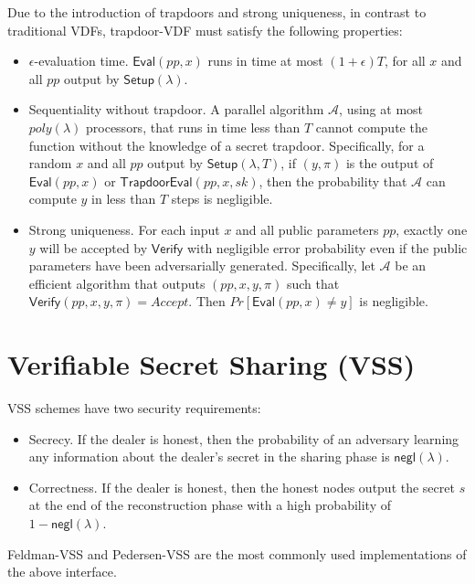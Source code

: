 \documentclass[letterpaper,twocolumn,10pt]{article}
\theoremstyle{definition}
\theoremstyle{remark}
\begin{document}
Due to the introduction of trapdoors and strong uniqueness, in contrast to traditional VDFs, trapdoor-VDF must satisfy the following properties:

\begin{itemize}
    \item $\epsilon$-evaluation time. $\mathsf{Eval}(pp, x)$ runs in time at most $(1 + \epsilon) T$, for all $x$ and all $pp$ output by $\mathsf{Setup}(\lambda)$.
    \item Sequentiality without trapdoor. A parallel algorithm $\mathcal{A}$, using at most $poly(\lambda)$ processors, that runs in time less than $T$ cannot compute the function without the knowledge of a secret trapdoor. Specifically, for a random $x$ and all $pp$ output by $\mathsf{Setup}(\lambda, T)$, if $(y, \pi)$ is the output of $\mathsf{Eval}(pp, x)$ or $\mathsf{TrapdoorEval}(pp,x,sk)$, then the probability that $\mathcal{A}$ can compute $y$ in less than $T$ steps is negligible.
    \item Strong uniqueness. For each input $x$ and all public parameters $pp$, exactly one $y$ will be accepted by $\mathsf{Verify}$ with negligible error probability even if the public parameters have been adversarially generated. Specifically, let $\mathcal{A}$ be an efficient algorithm that outputs $(pp, x, y, \pi)$ such that $\mathsf{Verify}(pp, x, y, \pi) = Accept$. Then $Pr[\mathsf{Eval}(pp, x) \neq y]$ is negligible.
\end{itemize}

\section{Verifiable Secret Sharing (VSS)}
\label{appendix:vss}
VSS schemes have two security requirements:
\begin{itemize}
    \item Secrecy. If the dealer is honest, then the probability of an adversary learning
    any information about the dealer’s secret in the sharing phase is $\mathsf{negl}(\lambda)$.
    \item Correctness. If the dealer is honest, then the honest nodes output the secret
    $s$ at the end of the reconstruction phase with a high probability of $1 - \mathsf{negl}(\lambda)$.
\end{itemize}
Feldman-VSS \cite{feldman1987practical} and Pedersen-VSS \cite{pedersen1991non} are the most commonly used implementations of the above interface.
\end{document}
